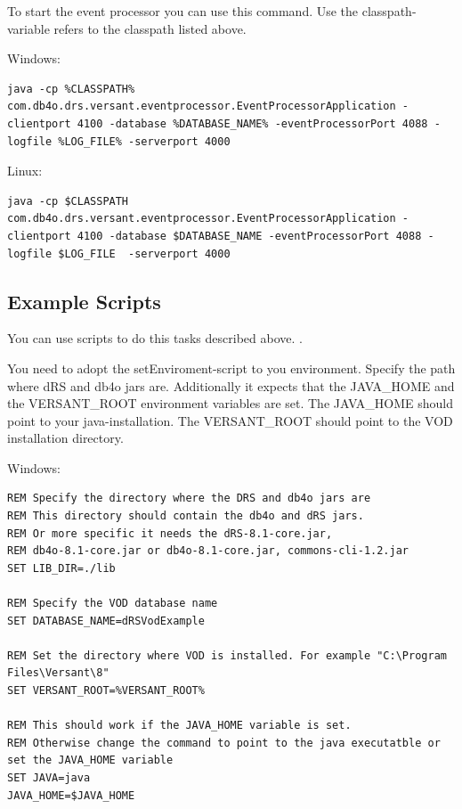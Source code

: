 To start the event processor you can use this command. Use the classpath-variable refers to the classpath listed above.

Windows:

\begin{lstlisting}
java -cp %CLASSPATH% com.db4o.drs.versant.eventprocessor.EventProcessorApplication -clientport 4100 -database %DATABASE_NAME% -eventProcessorPort 4088 -logfile %LOG_FILE% -serverport 4000
\end{lstlisting}

Linux:

\begin{lstlisting}
java -cp $CLASSPATH com.db4o.drs.versant.eventprocessor.EventProcessorApplication -clientport 4100 -database $DATABASE_NAME -eventProcessorPort 4088 -logfile $LOG_FILE  -serverport 4000
\end{lstlisting}

\subsection{Example Scripts}
\label{drs:db4o-replication-system-drs-vod-setup-event-processing:examplescripts}

You can use scripts to do this tasks described above. .

You need to adopt the setEnviroment-script to you environment. Specify the path where dRS and db4o jars are. Additionally it expects that the JAVA\_HOME and the VERSANT\_ROOT environment variables are set. The JAVA\_HOME should point to your java-installation. The VERSANT\_ROOT should point to the VOD installation directory.

Windows:

\begin{lstlisting}
REM Specify the directory where the DRS and db4o jars are
REM This directory should contain the db4o and dRS jars.
REM Or more specific it needs the dRS-8.1-core.jar, 
REM db4o-8.1-core.jar or db4o-8.1-core.jar, commons-cli-1.2.jar
SET LIB_DIR=./lib

REM Specify the VOD database name
SET DATABASE_NAME=dRSVodExample

REM Set the directory where VOD is installed. For example "C:\Program Files\Versant\8"
SET VERSANT_ROOT=%VERSANT_ROOT%

REM This should work if the JAVA_HOME variable is set. 
REM Otherwise change the command to point to the java executatble or set the JAVA_HOME variable
SET JAVA=java
JAVA_HOME=$JAVA_HOME
\end{lstlisting}

